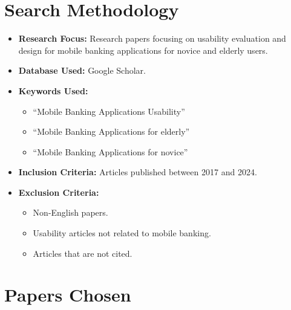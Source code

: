 \documentclass[a4paper,12pt]{report}
\begin{document}
\section{Search Methodology}
\begin{itemize}
  \item \textbf{Research Focus:}
        Research papers focusing on usability evaluation and design for mobile banking applications for novice and elderly users.

  \item \textbf{Database Used:}
        Google Scholar.

  \item \textbf{Keywords Used:}
        \begin{itemize}
          \item “Mobile Banking Applications Usability”
          \item “Mobile Banking Applications for elderly”
          \item “Mobile Banking Applications for novice”
        \end{itemize}

  \item \textbf{Inclusion Criteria:}
        Articles published between 2017 and 2024.

  \item \textbf{Exclusion Criteria:}
        \begin{itemize}
          \item Non-English papers.
          \item Usability articles not related to mobile banking.
          \item Articles that are not cited.
        \end{itemize}
\end{itemize}
\vspace{2cm}
\section{Papers Chosen}
\begin{table}[ht]
  \centering
  \caption{List of Selected Papers for Systematic Literature Review}
  \label{tab:papers}
\end{table}
\end{document}
